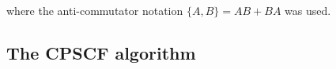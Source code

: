 \documentclass[prl,aps,twocolumn,showpacs,twocolumngrid,superbib]{revtex4}
\def\D{\mathcal{D}}
\begin{document}
where the anti-commutator notation $\{A,B\} = AB+BA$
was used.

\subsection{The CPSCF algorithm}
\end{document}
